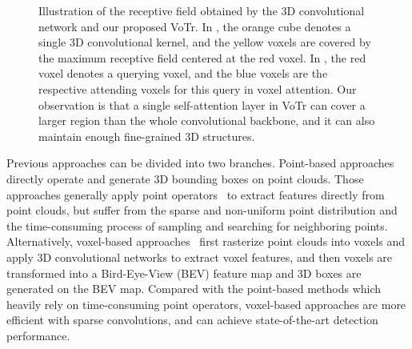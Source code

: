 \documentclass[10pt,twocolumn,letterpaper]{article}
\begin{document}
\begin{figure}[!t] \centering   
{}    
\caption{Illustration of the receptive field obtained by the 3D convolutional network and our proposed VoTr. In , the orange cube denotes a single 3D convolutional kernel, and the yellow voxels are covered by the maximum receptive field centered at the red voxel. In , the red voxel denotes a querying voxel, and the blue voxels are the respective attending voxels for this query in voxel attention. Our observation is that a single self-attention layer in VoTr can cover a larger region than the whole convolutional backbone, and it can also maintain enough fine-grained 3D structures.}     
\label{fig_intro} 
\vspace{-3mm}
\end{figure}

Previous approaches can be divided into two branches. Point-based approaches~\cite{shi2019pointrcnn, pan20203d, yang20203dssd, yang2019std} directly operate and generate 3D bounding boxes on point clouds. Those approaches generally apply point operators~\cite{qi2017pointnet, mao2019} to extract features directly from point clouds, but suffer from the sparse and non-uniform point distribution and the time-consuming process of sampling and searching for neighboring points. Alternatively, voxel-based approaches~\cite{zhou2018voxelnet, yan2018second, yin2020center, mao2021one, ye2020hvnet} first rasterize point clouds into voxels and apply 3D convolutional networks to extract voxel features, and then voxels are transformed into a Bird-Eye-View (BEV) feature map and 3D boxes are generated on the BEV map. Compared with the point-based methods which heavily rely on time-consuming point operators, voxel-based approaches are more efficient with sparse convolutions, and can achieve state-of-the-art detection performance.
\end{document}
